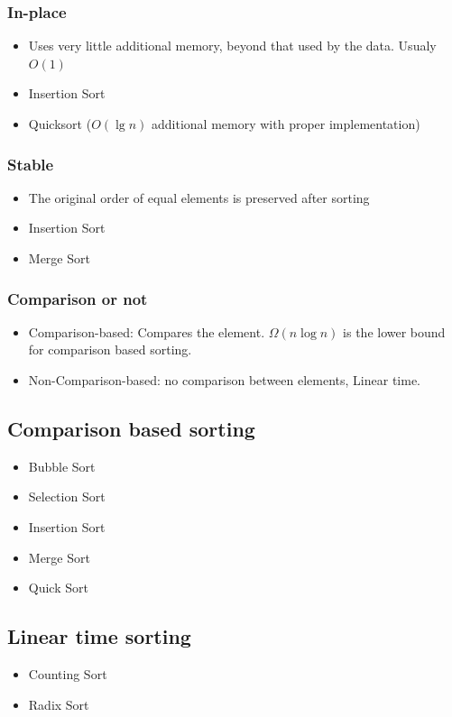 \documentclass{article}
\begin{document}
\begin{multicols*}{4}
\subsubsection{In-place}
\begin{itemize}
\item Uses very little additional memory, beyond that used by the data. Usualy $O(1)$
\item Insertion Sort
\item Quicksort ($O(\lg n)$ additional memory with proper implementation)
\end{itemize}
\subsubsection{Stable}
\begin{itemize}
\item The original order of equal elements is preserved after sorting
\item Insertion Sort
\item Merge Sort
\end{itemize}
\subsubsection{Comparison or not}
\begin{itemize}
\item Comparison-based: Compares the element. $\Omega(n \log n)$ is the lower bound for comparison based sorting.
\item Non-Comparison-based: no comparison between elements, Linear time.
\end{itemize}
\subsection{Comparison based sorting}
\begin{itemize}
\item Bubble Sort
\item Selection Sort
\item Insertion Sort
\item Merge Sort
\item Quick Sort
\end{itemize}
\subsection{Linear time sorting}
\begin{itemize}
\item Counting Sort
\item Radix Sort
\end{itemize}


\end{multicols*}
\end{document}
